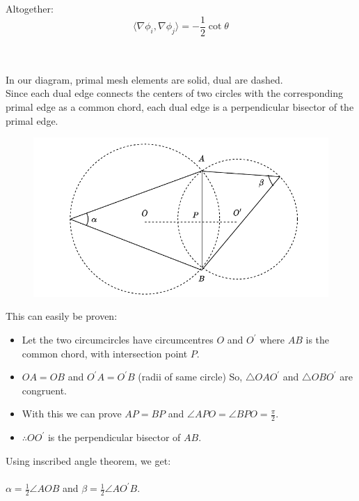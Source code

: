 \documentclass{article}
\newcommand\ifrac[2]{{\displaystyle\frac{#1}{#2}}}
\def\grad{\nabla}
\def\hal{\ifrac{1}{2}}
\begin{document}
Altogether:
$$
    \langle \grad \phi_i, \grad \phi_j \rangle = -\hal \cot\theta
$$


\vspace{1.8cm}
\\\\

In our diagram, primal mesh elements are solid, dual are dashed.\\

Since each dual edge connects the centers of two circles with the corresponding primal edge as a common chord,
each dual edge is a perpendicular bisector of the primal edge.

\begin{figure}
    \includegraphics[scale=0.8]{figs/chord.pdf}
\end{figure}

This can easily be proven:
\begin{itemize}
    \item Let the two circumcircles have circumcentres $O$ and $O^\prime$ where $AB$ is the common chord,
    with intersection point $P$.
    \item $OA=OB$ and $O^\prime A = O^\prime B$ (radii of same circle) So,
    $\triangle OAO^\prime$ and $\triangle OBO^\prime$ are congruent. 
    \item With this we can prove $AP=BP$ and $\angle APO = \angle BPO = \ifrac{\pi}{2}$.
    \item $\therefore OO^\prime$ is the perpendicular bisector of $AB$.
\end{itemize}

Using inscribed angle theorem, we get:\\\\
$\alpha = \hal \angle AOB$ and $\beta = \hal \angle AO^\prime B$.\\
\end{document}
